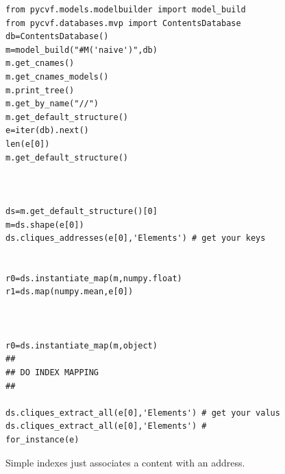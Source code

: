 \documentclass{report}
\begin{document}
\begin{lstlisting}
from pycvf.models.modelbuilder import model_build
from pycvf.databases.mvp import ContentsDatabase
db=ContentsDatabase()
m=model_build("#M('naive')",db)
m.get_cnames()
m.get_cnames_models()
m.print_tree()
m.get_by_name("//")
m.get_default_structure()
e=iter(db).next()
len(e[0])
m.get_default_structure()



ds=m.get_default_structure()[0]
m=ds.shape(e[0])
ds.cliques_addresses(e[0],'Elements') # get your keys 


r0=ds.instantiate_map(m,numpy.float)
r1=ds.map(numpy.mean,e[0])



r0=ds.instantiate_map(m,object)
##
## DO INDEX MAPPING
##

ds.cliques_extract_all(e[0],'Elements') # get your valus
ds.cliques_extract_all(e[0],'Elements') #
for_instance(e)

\end{lstlisting}













Simple indexes just associates a content with an address.
\end{document}
